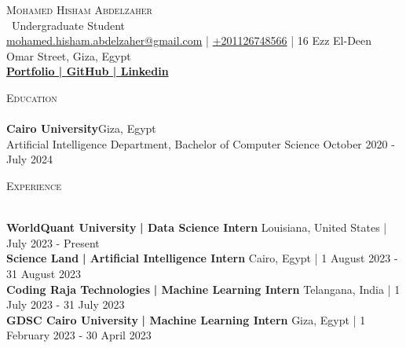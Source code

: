 \documentclass[a4paper]{article}
\newcommand{\lineunder} {
    \vspace*{-8pt} \\
    \hspace*{-18pt} \hrulefill \\
}
\newcommand{\header} [1] {
    {\hspace*{-18pt}\vspace*{6pt} \textsc{#1}}
    \vspace*{-6pt} \lineunder
}
\begin{document}
    \vspace*{-40pt}

    

%
%
  \vspace*{-2pt}
  \begin{center}
    {\Huge \scshape {Mohamed Hisham Abdelzaher}}\\
    \vspace*{2pt}
    \ {Undergraduate Student}\\
    \vspace*{2pt}
    \href{mailto:mohamed.hisham.abdelzaher@gmail.com}{mohamed.hisham.abdelzaher@gmail.com} | \href{tel:+201126748566}{+201126748566} | 16 Ezz El-Deen Omar Street, Giza, Egypt\\
    \vspace*{2pt}
    \textbf{\href{https://mh0386.github.io}{Portfolio | }}\textbf{\href{https://github.com/MH0386}{GitHub | }}\textbf{\href{https://linkedin.com/in/MH0386}{Linkedin}}\\
  \end{center}



      \header{Education}
      \vspace{2mm}
      \textbf{Cairo University}\hfill Giza, Egypt\\
Artificial Intelligence Department, Bachelor of Computer Science \hfill October 2020 - July 2024\\
\vspace{2mm}

%
%
  \header{Experience}
  \vspace{2mm}

  \textbf{WorldQuant University}\textbf{ | Data Science Intern} \hfill Louisiana, United States | July 2023 - Present\\
  \textbf{Science Land}\textbf{ | Artificial Intelligence Intern} \hfill Cairo, Egypt | 1 August 2023 - 31 August 2023\\
  \textbf{Coding Raja Technologies}\textbf{ | Machine Learning Intern} \hfill Telangana, India | 1 July 2023 - 31 July 2023\\
  \textbf{GDSC Cairo University}\textbf{ | Machine Learning Intern} \hfill Giza, Egypt | 1 February 2023 - 30 April 2023\\
\end{document}

